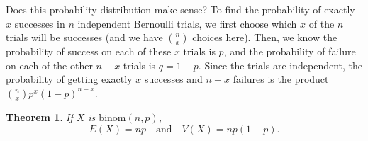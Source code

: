 \documentclass[
]{book}
\newtheorem{theorem}{Theorem}[chapter]
\theoremstyle{definition}
\theoremstyle{definition}
\theoremstyle{definition}
\theoremstyle{definition}
\theoremstyle{remark}
\begin{document}
Does this probability distribution make sense? To find the probability of exactly \(x\) successes in \(n\) independent Bernoulli trials, we first choose which \(x\) of the \(n\) trials will be successes (and we have \(\binom{n}{x}\) choices here). Then, we know the probability of success on each of these \(x\) trials is \(p\), and the probability of failure on each of the other \(n-x\) trials is \(q = 1-p\). Since the trials are independent, the probability of getting exactly \(x\) successes and \(n-x\) failures is the product \(\binom{n}{x}p^x(1-p)^{n-x}.\)

\begin{theorem}
\protect\hypertarget{thm:binomial-distribution-EandV}{}\label{thm:binomial-distribution-EandV}If \(X\) is \(\text{binom}(n,p)\), \[E(X) = np~~~\text{ and }~~~ V(X) = np(1-p).\]
\end{theorem}
\end{document}

